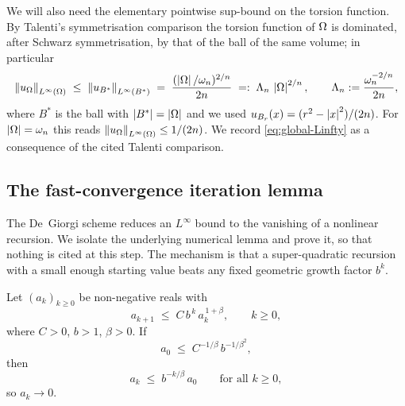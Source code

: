 We will also need the elementary pointwise sup-bound on the torsion
function. By Talenti's symmetrisation comparison the torsion function of
$\Omega$ is dominated, after Schwarz symmetrisation, by that of the ball of
the same volume; in particular
\begin{equation}\label{eq:global-Linfty}
   \left\|u_\Omega\right\|_{L^\infty(\Omega)}\;\le\;\left\|u_{B^*}\right\|_{L^\infty(B^*)}
   \;=\;\frac{(\left|\Omega\right|/\omega_n)^{2/n}}{2n}
   \;=:\;\Lambda_n\,\left|\Omega\right|^{2/n},
   \qquad \Lambda_n:=\frac{\omega_n^{-2/n}}{2n},
\end{equation}
where $B^*$ is the ball with $\left|B^*\right|=\left|\Omega\right|$ and we used
$u_{B_r}(x)=(r^2-\left|x\right|^2)/(2n)$. For $\left|\Omega\right|=\omega_n$ this reads
$\left\|u_\Omega\right\|_{L^\infty(\Omega)}\le 1/(2n)$. We record \eqref{eq:global-Linfty}
as a consequence of the cited Talenti comparison.

\subsection{The fast-convergence iteration lemma}\label{ssec:DG-lemma}

The De~Giorgi scheme reduces an $L^\infty$ bound to the vanishing of a
nonlinear recursion. We isolate the underlying numerical lemma and prove
it, so that nothing is cited at this step. The mechanism is that a
super-quadratic recursion with a small enough starting value beats any
fixed geometric growth factor $b^k$.

\begin{lemma}\label{lem:DG-iteration2}
Let $(a_k)_{k\ge0}$ be non-negative reals with
\begin{equation}\label{eq:DG-recursion2}
   a_{k+1}\;\le\;C\,b^{\,k}\,a_k^{\,1+\beta},\qquad k\ge0,
\end{equation}
where $C>0$, $b>1$, $\beta>0$. If
\begin{equation}\label{eq:DG-smallness2}
   a_0\;\le\;C^{-1/\beta}\,b^{-1/\beta^2},
\end{equation}
then
\begin{equation}\label{eq:DG-conclusion}
   a_k\;\le\;b^{-k/\beta}\,a_0\qquad\text{for all }k\ge0,
\end{equation}
so $a_k\to0$.
\end{lemma}

